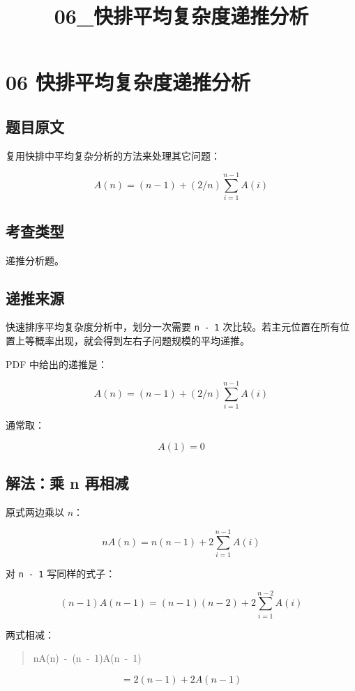 \documentclass[UTF8,zihao=-4]{ctexart}
\title{06\_快排平均复杂度递推分析}
\author{}
\date{}
\begin{document}
\maketitle

\section*{06 快排平均复杂度递推分析}

\subsection*{题目原文}

复用快排中平均复杂分析的方法来处理其它问题：

\[A(n) = (n - 1) + (2/n) \sum_{i=1}^{n-1} A(i)\]

\subsection*{考查类型}

递推分析题。

\subsection*{递推来源}

快速排序平均复杂度分析中，划分一次需要 \texttt{n - 1} 次比较。若主元位置在所有位置上等概率出现，就会得到左右子问题规模的平均递推。

PDF 中给出的递推是：

\[A(n) = (n - 1) + (2/n) \sum_{i=1}^{n-1} A(i)\]

通常取：

\[A(1) = 0\]

\subsection*{解法：乘 n 再相减}

原式两边乘以 $n$：

\[nA(n) = n(n - 1) + 2 \sum_{i=1}^{n-1} A(i)\]

对 \texttt{n - 1} 写同样的式子：

\[(n - 1)A(n - 1) = (n - 1)(n - 2) + 2 \sum_{i=1}^{n-2} A(i)\]

两式相减：

\begin{quote}
\small\ttfamily\raggedright
\relax nA(n)\ -\ (n\ -\ 1)A(n\ -\ 1)\\
\end{quote}
\[= 2(n - 1) + 2A(n - 1)\]
\end{document}
